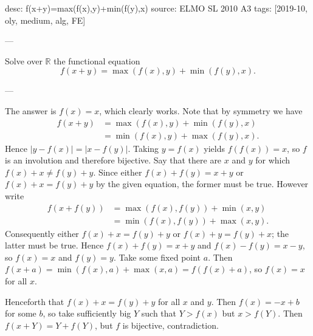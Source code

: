 desc: f(x+y)=max(f(x),y)+min(f(y),x)
source: ELMO SL 2010 A3
tags: [2019-10, oly, medium, alg, FE]

---

Solve over $\mathbb R$ the functional equation \[f(x+y)=\max(f(x),y)+\min(f(y),x).\]

---

The answer is $f(x)=x$, which clearly works. Note that by symmetry we have
\begin{align*}
    f(x+y)&=\max(f(x),y)+\min(f(y),x)\\
    &=\min(f(x),y)+\max(f(y),x).
\end{align*}
Hence $|y-f(x)|=|x-f(y)|$. Taking $y=f(x)$ yields $f(f(x))=x$, so $f$ is an involution and therefore bijective. Say that there are $x$ and $y$ for which $f(x)+x\ne f(y)+y$. Since either $f(x)+f(y)=x+y$ or $f(x)+x=f(y)+y$ by the given equation, the former must be true. However write
\begin{align*}
    f(x+f(y))&=\max(f(x),f(y))+\min(x,y)\\
    &=\min(f(x),f(y))+\max(x,y).
\end{align*}
Consequently either $f(x)+x=f(y)+y$ or $f(x)+y=f(y)+x$; the latter must be true. Hence $f(x)+f(y)=x+y$ and $f(x)-f(y)=x-y$, so $f(x)=x$ and $f(y)=y$. Take some fixed point $a$. Then $f(x+a)=\min(f(x),a)+\max(x,a)=f(f(x)+a)$, so $f(x)=x$ for all $x$.

Henceforth that $f(x)+x=f(y)+y$ for all $x$ and $y$. Then $f(x)=-x+b$ for some $b$, so take sufficiently big $Y$ such that $Y>f(x)$ but $x>f(Y)$. Then $f(x+Y)=Y+f(Y)$, but $f$ is bijective, contradiction.
